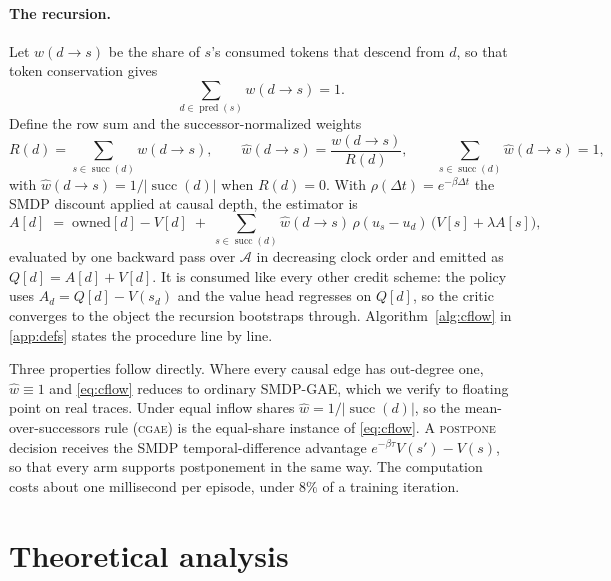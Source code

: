 \documentclass[review,authoryear,3p,times]{elsarticle}
\newcommand{\cgae}{\textsc{cgae}}              %
\newcommand{\Ascr}{\mathcal{A}}
\newcommand{\pred}{\operatorname{pred}}
\newcommand{\suc}{\operatorname{succ}}
\begin{document}
\paragraph{The recursion.} Let $w(d\!\to\!s)$ be the share of $s$'s consumed
tokens that descend from $d$, so that token conservation gives
\begin{equation}
\sum_{d\in\pred(s)} w(d\!\to\!s) = 1 .
\label{eq:predsum}
\end{equation}
Define the row sum and the successor-normalized weights
\begin{equation}
R(d) = \sum_{s\in\suc(d)} w(d\!\to\!s), \qquad
\hat{w}(d\!\to\!s) = \frac{w(d\!\to\!s)}{R(d)},\qquad
\sum_{s\in\suc(d)}\hat{w}(d\!\to\!s)=1 ,
\label{eq:sucsum}
\end{equation}
with $\hat w(d\!\to\!s)=1/|\suc(d)|$ when $R(d)=0$. With
$\rho(\Delta t)=e^{-\beta\Delta t}$ the SMDP discount applied at causal depth,
the estimator is
\begin{equation}
A[d] \;=\; \mathrm{owned}[d] - V[d]
\;+\; \sum_{s\in\suc(d)} \hat{w}(d\!\to\!s)\,\rho(u_s-u_d)\,
      \bigl( V[s] + \lambda A[s] \bigr),
\label{eq:cflow}
\end{equation}
evaluated by one backward pass over $\Ascr$ in decreasing clock order and
emitted as $Q[d]=A[d]+V[d]$. It is consumed like every other credit scheme: the
policy uses $A_d=Q[d]-V(s_d)$ and the value head regresses on $Q[d]$, so the
critic converges to the object the recursion bootstraps through.
Algorithm~\ref{alg:cflow} in \ref{app:defs} states the procedure line by line.

Three properties follow directly. Where every causal edge has out-degree one,
$\hat w\equiv1$ and \eqref{eq:cflow} reduces to ordinary SMDP-GAE, which we
verify to floating point on real traces. Under equal inflow shares
$\hat w=1/|\suc(d)|$, so the mean-over-successors rule (\cgae) is the
equal-share instance of \eqref{eq:cflow}. A \textsc{postpone} decision receives
the SMDP temporal-difference advantage $e^{-\beta\tau}V(s')-V(s)$, so that every
arm supports postponement in the same way. The computation costs about one
millisecond per episode, under $8\%$ of a training iteration.

\section{Theoretical analysis}
\label{sec:theory}
\end{document}

